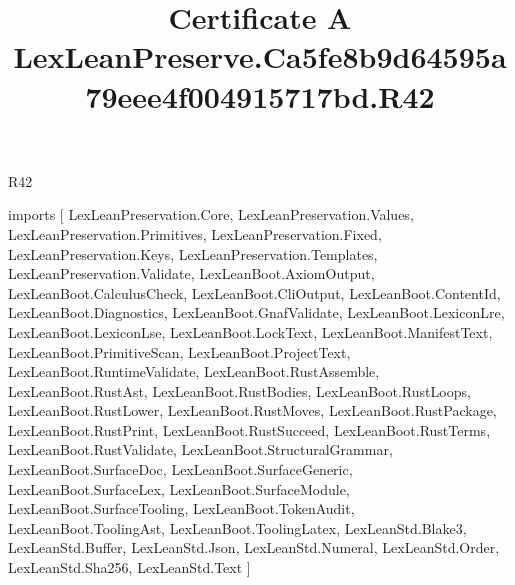 \begin{lexlean}{R42}
\title{Certificate A LexLeanPreserve.Ca5fe8b9d64595a79eee4f004915717bd.R42}
\begin{coremodule}
imports [
  LexLeanPreservation.Core,
  LexLeanPreservation.Values,
  LexLeanPreservation.Primitives,
  LexLeanPreservation.Fixed,
  LexLeanPreservation.Keys,
  LexLeanPreservation.Templates,
  LexLeanPreservation.Validate,
  LexLeanBoot.AxiomOutput,
  LexLeanBoot.CalculusCheck,
  LexLeanBoot.CliOutput,
  LexLeanBoot.ContentId,
  LexLeanBoot.Diagnostics,
  LexLeanBoot.GnafValidate,
  LexLeanBoot.LexiconLre,
  LexLeanBoot.LexiconLse,
  LexLeanBoot.LockText,
  LexLeanBoot.ManifestText,
  LexLeanBoot.PrimitiveScan,
  LexLeanBoot.ProjectText,
  LexLeanBoot.RuntimeValidate,
  LexLeanBoot.RustAssemble,
  LexLeanBoot.RustAst,
  LexLeanBoot.RustBodies,
  LexLeanBoot.RustLoops,
  LexLeanBoot.RustLower,
  LexLeanBoot.RustMoves,
  LexLeanBoot.RustPackage,
  LexLeanBoot.RustPrint,
  LexLeanBoot.RustSucceed,
  LexLeanBoot.RustTerms,
  LexLeanBoot.RustValidate,
  LexLeanBoot.StructuralGrammar,
  LexLeanBoot.SurfaceDoc,
  LexLeanBoot.SurfaceGeneric,
  LexLeanBoot.SurfaceLex,
  LexLeanBoot.SurfaceModule,
  LexLeanBoot.SurfaceTooling,
  LexLeanBoot.TokenAudit,
  LexLeanBoot.ToolingAst,
  LexLeanBoot.ToolingLatex,
  LexLeanStd.Blake3,
  LexLeanStd.Buffer,
  LexLeanStd.Json,
  LexLeanStd.Numeral,
  LexLeanStd.Order,
  LexLeanStd.Sha256,
  LexLeanStd.Text
]


\end{coremodule}
\end{lexlean}
